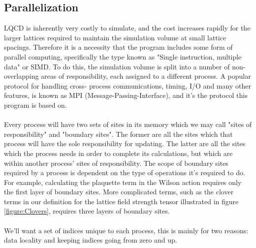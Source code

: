 \documentclass[a4paper,10pt]{article}
\begin{document}
\subsection{Parallelization}\label{sec:parallelization}
LQCD is inherently very costly to simulate, and the cost increases rapidly for the larger lattices required to maintain the simulation volume at small lattice spacings. Therefore it is a necessity that the program includes some form of parallel computing, specifically the type known as "Single instruction, multiple data" or SIMD. To do this, the simulation volume is split into a number of non-overlapping areas of responsibility, each assigned to a different process. A popular protocol for handling cross- process communications, timing, I/O and many other features, is known as MPI (Message-Passing-Interface), and it's the protocol this program is based on.\\\\Every process will have two sets of sites in its memory which we may call "sites of responsibility" and "boundary sites". The former are all the sites which that process will have the sole responsibility for updating. The latter are all the sites which the process needs in order to complete its calculations, but which are within another process' sites of responsibility. The scope of boundary sites required by a process is dependent on the type of operations it's required to do. For example, calculating the plaquette term in the Wilson action requires only the first layer of boundary sites. More complicated terms, such as the clover terms in our definition for the lattice field strength tensor  illustrated in figure \ref{figure:Clovers}, requires three layers of boundary sites.\\\\We'll want a set of indices unique to each process, this is mainly for two reasons: data locality and keeping indices going from zero and up.
\end{document}
